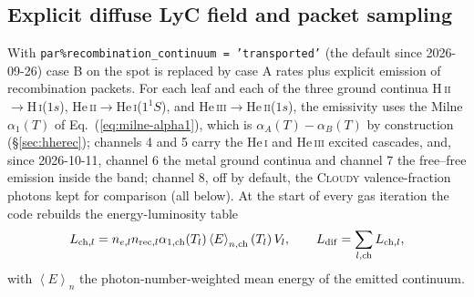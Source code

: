 \documentclass[english,a4paper]{my_memo}
\newcommand{\code}[1]{\texttt{#1}}
\begin{document}
\subsection{Explicit diffuse LyC field and packet sampling}
\label{sec:diffuse}
With \code{par\%recombination\_continuum = 'transported'} (the default
since 2026-09-26) case B on the spot is replaced by case A rates plus
explicit emission of recombination packets.  For each leaf and each of the
three ground continua H\,\textsc{ii}$\rightarrow$H\,\textsc{i}($1s$),
He\,\textsc{ii}$\rightarrow$He\,\textsc{i}($1^1S$), and
He\,\textsc{iii}$\rightarrow$He\,\textsc{ii}($1s$), the emissivity uses
the Milne $\alpha_1(T)$ of Eq.~(\ref{eq:milne-alpha1}), which is
$\alpha_A(T)-\alpha_B(T)$ by construction (\S\ref{sec:hherec}); channels
4 and 5 carry the He\,\textsc{i} and He\,\textsc{iii} excited cascades,
and, since 2026-10-11, channel 6 the metal ground continua and channel 7
the free--free emission inside the band; channel 8, off by default, the
\textsc{Cloudy} valence-fraction photons kept for comparison (all below).  At the start of every gas
iteration the code rebuilds the energy-luminosity table
\begin{equation}
 L_{{\rm ch},l} = n_{e,l}n_{{\rm rec},l}\alpha_{1,\rm ch}(T_l)
      \left<E\right>_{n,\rm ch}(T_l)\,V_l,
 \qquad L_{\rm dif}=\sum_{l,{\rm ch}} L_{{\rm ch},l},
 \label{eq:diffuse-luminosity}
\end{equation}
with $\left<E\right>_n$ the photon-number-weighted mean energy of the
emitted continuum.
\end{document}
